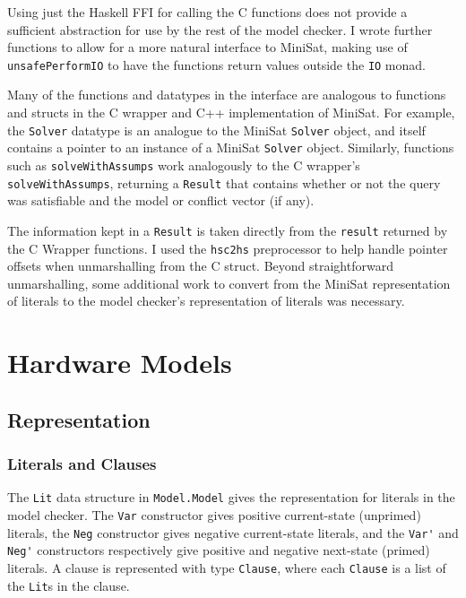 \documentclass[12pt,a4paper,twoside,openright]{report}
\begin{document}
{Using just the Haskell FFI for calling the C functions does not provide a
sufficient abstraction for use by the rest of the model checker.
I wrote further functions to allow for a more natural interface to MiniSat,
 making use of \verb,unsafePerformIO, to have the functions return
values outside the \verb,IO, monad.

Many of the functions and datatypes in the interface are analogous to functions and structs in
the C wrapper and C++ implementation of MiniSat. For example, the \verb,Solver, datatype is an
analogue to the MiniSat \verb,Solver, object, and itself contains a pointer to an instance of
a MiniSat \verb,Solver, object. Similarly, functions such as \verb,solveWithAssumps, work
analogously to the C wrapper's \verb,solveWithAssumps,, returning a \verb,Result, that contains
whether or not the query was satisfiable and the model or conflict vector (if any).

The information kept in a \verb,Result, is taken directly from the \verb,result, returned by
the C Wrapper functions. I used the \verb,hsc2hs, preprocessor to help handle pointer offsets
when unmarshalling from the C struct. Beyond straightforward unmarshalling, some additional work
to convert from the MiniSat representation of literals to the model checker’s representation of
literals was necessary.

\section{Hardware Models}
\subsection{Representation}
\subsubsection{Literals and Clauses}
The \verb,Lit, data structure in \verb,Model.Model, gives the representation for literals in
the model checker.
The \verb,Var, constructor gives positive current-state (unprimed) literals, the \verb,Neg,
constructor gives negative current-state literals, and the \verb,Var', and \verb,Neg', constructors
respectively give positive and negative next-state (primed) literals.
A clause is represented with type \verb,Clause,, where each \verb,Clause, is a
list of the \verb,Lit,s in the clause.

}
\end{document}
